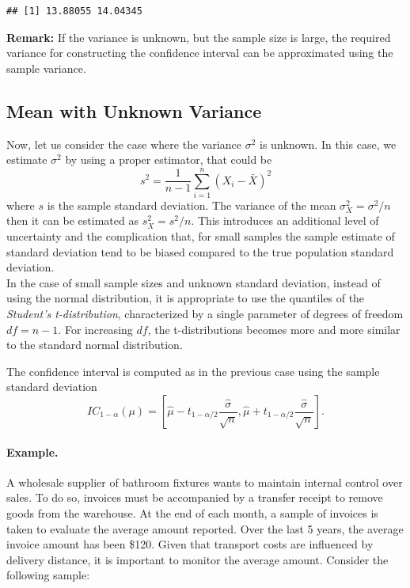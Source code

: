 \documentclass[
]{article}
\begin{document}
\begin{verbatim}
## [1] 13.88055 14.04345
\end{verbatim}

\textbf{Remark:} If the variance is unknown, but the sample size is
large, the required variance for constructing the confidence interval
can be approximated using the sample variance.

\hypertarget{mean-with-unknown-variance}{%
\subsection{Mean with Unknown
Variance}\label{mean-with-unknown-variance}}

Now, let us consider the case where the variance \(\sigma^2\) is
unknown. In this case, we estimate \(\sigma^2\) by using a proper
estimator, that could be
\[s^2 = \frac{1}{n-1}\sum_{i=1}^n(X_i - \bar{X})^2\] where \(s\) is the
sample standard deviation. The variance of the mean
\(\sigma^2_X = \sigma^2/n\) then it can be estimated as
\(s^2_X = s^2/n\). This introduces an additional level of uncertainty
and the complication that, for small samples the sample estimate of
standard deviation tend to be biased compared to the true population
standard deviation.\\
In the case of small sample sizes and unknown standard deviation,
instead of using the normal distribution, it is appropriate to use the
quantiles of the \emph{Student's t-distribution}, characterized by a
single parameter of degrees of freedom \(df = n-1\). For increasing
\(df\), the t-distributions becomes more and more similar to the
standard normal distribution.

The confidence interval is computed as in the previous case using the
sample standard deviation
\[IC_{1-\alpha}(\mu) = \left[ \hat{\mu} - t_{1-\alpha/2}\frac{\hat\sigma}{\sqrt{n}}, \hat{\mu} + t_{1-\alpha/2}\frac{\hat\sigma}{\sqrt{n}} \right].\]

\hypertarget{example.}{%
\paragraph{Example.}\label{example.}}

A wholesale supplier of bathroom fixtures wants to maintain internal
control over sales. To do so, invoices must be accompanied by a transfer
receipt to remove goods from the warehouse. At the end of each month, a
sample of invoices is taken to evaluate the average amount reported.
Over the last 5 years, the average invoice amount has been \$120. Given
that transport costs are influenced by delivery distance, it is
important to monitor the average amount. Consider the following sample:
\end{document}
